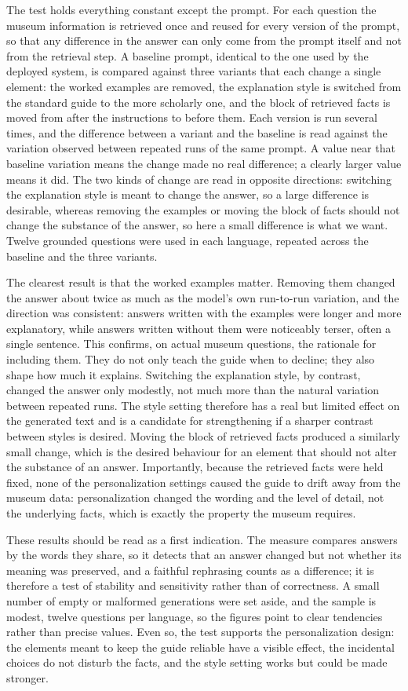 The test holds everything constant except the prompt. For each question the museum information is retrieved once and reused for every version of the prompt, so that any difference in the answer can only come from the prompt itself and not from the retrieval step. A baseline prompt, identical to the one used by the deployed system, is compared against three variants that each change a single element: the worked examples are removed, the explanation style is switched from the standard guide to the more scholarly one, and the block of retrieved facts is moved from after the instructions to before them. Each version is run several times, and the difference between a variant and the baseline is read against the variation observed between repeated runs of the same prompt. A value near that baseline variation means the change made no real difference; a clearly larger value means it did. The two kinds of change are read in opposite directions: switching the explanation style is meant to change the answer, so a large difference is desirable, whereas removing the examples or moving the block of facts should not change the substance of the answer, so here a small difference is what we want. Twelve grounded questions were used in each language, repeated across the baseline and the three variants.

The clearest result is that the worked examples matter. Removing them changed the answer about twice as much as the model's own run-to-run variation, and the direction was consistent: answers written with the examples were longer and more explanatory, while answers written without them were noticeably terser, often a single sentence. This confirms, on actual museum questions, the rationale for including them. They do not only teach the guide when to decline; they also shape how much it explains. Switching the explanation style, by contrast, changed the answer only modestly, not much more than the natural variation between repeated runs. The style setting therefore has a real but limited effect on the generated text and is a candidate for strengthening if a sharper contrast between styles is desired. Moving the block of retrieved facts produced a similarly small change, which is the desired behaviour for an element that should not alter the substance of an answer. Importantly, because the retrieved facts were held fixed, none of the personalization settings caused the guide to drift away from the museum data: personalization changed the wording and the level of detail, not the underlying facts, which is exactly the property the museum requires.

These results should be read as a first indication. The measure compares answers by the words they share, so it detects that an answer changed but not whether its meaning was preserved, and a faithful rephrasing counts as a difference; it is therefore a test of stability and sensitivity rather than of correctness. A small number of empty or malformed generations were set aside, and the sample is modest, twelve questions per language, so the figures point to clear tendencies rather than precise values. Even so, the test supports the personalization design: the elements meant to keep the guide reliable have a visible effect, the incidental choices do not disturb the facts, and the style setting works but could be made stronger.
